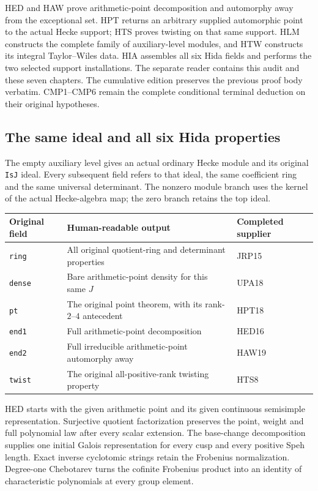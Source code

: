 \documentclass[11pt,a4paper]{article}
\numberwithin{equation}{section}
\theoremstyle{remark}\newtheorem{remark}[theorem]{Remark}
\begin{document}
HED and HAW prove arithmetic-point decomposition and automorphy
away from the exceptional set.  HPT returns an arbitrary supplied
automorphic point to the actual Hecke support; HTS proves twisting
on that same support.  HLM constructs the complete family of
auxiliary-level modules, and HTW constructs its integral
Taylor--Wiles data.  HIA assembles all six Hida fields and performs
the two selected support installations.  The separate reader
contains this audit and these seven chapters.  The cumulative
edition preserves the previous proof body verbatim.  CMP1--CMP6
remain the complete conditional terminal deduction on their
original hypotheses.

\subsection{The same ideal and all six Hida properties}

The empty auxiliary level gives an actual ordinary Hecke module
and its original \texttt{Is\allowbreak J} ideal.  Every subsequent field refers
to that ideal, the same coefficient ring and the same universal
determinant.  The nonzero module branch uses the kernel of the
actual Hecke-algebra map; the zero branch retains the top ideal.

\begin{center}
\begin{tabular}{@{}p{}p{}p{}@{}}
\toprule
Original field & Human-readable output & Completed supplier\\
\midrule
\texttt{ring} & All original quotient-ring and determinant properties & JRP15\\
\texttt{dense} & Bare arithmetic-point density for this same $J$ & UPA18\\
\texttt{pt} & The original point theorem, with its rank-$2$--$4$ antecedent & HPT18\\
\texttt{end1} & Full arithmetic-point decomposition & HED16\\
\texttt{end2} & Full irreducible arithmetic-point automorphy away & HAW19\\
\texttt{twist} & The original all-positive-rank twisting property & HTS8\\
\bottomrule
\end{tabular}
\end{center}

HED starts with the given arithmetic point and its given continuous
semisimple representation.  Surjective quotient factorization
preserves the point, weight and full polynomial law after every
scalar extension.  The base-change decomposition supplies one
initial Galois representation for every cusp and every positive
Speh length.  Exact inverse cyclotomic strings retain the
Frobenius normalization.  Degree-one Chebotarev turns the cofinite
Frobenius product into an identity of characteristic polynomials
at every group element.
\end{document}

